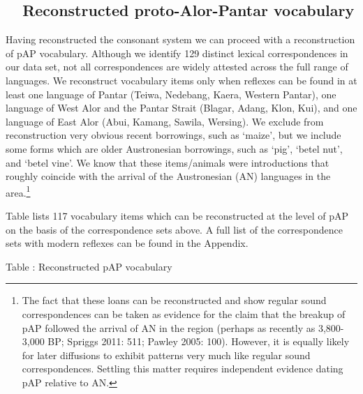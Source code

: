 \subsection[\ \ Reconstructed proto{}-Alor{}-Pantar vocabulary]{\ \ Reconstructed proto-Alor-Pantar vocabulary}
\hypertarget{RefHeading49927871885726}{}Having reconstructed the consonant system we can proceed with a reconstruction of pAP vocabulary. Although we identify 129 distinct lexical correspondences in our data set, not all correspondences are widely attested across the full range of languages. We reconstruct vocabulary items only when reflexes can be found in at least one language of Pantar (Teiwa, Nedebang, Kaera, Western Pantar), one language of West Alor and the Pantar Strait (Blagar, Adang, Klon, Kui), and one language of East Alor (Abui, Kamang, Sawila, Wersing). We exclude from reconstruction very obvious recent borrowings, such as {\textquoteleft}maize{\textquoteright}, but we include some forms which are older Austronesian borrowings, such as {\textquoteleft}pig{\textquoteright}, {\textquoteleft}betel nut{\textquoteright}, and {\textquoteleft}betel vine{\textquoteright}. We know that these items/animals were introductions that roughly coincide with the arrival of the Austronesian (AN) languages in the 
area.\footnote{ The fact that these loans can be reconstructed and show regular sound correspondences can be taken as evidence for the claim that the breakup of pAP followed the arrival of AN in the region (perhaps as recently as 3,800-3,000 BP; Spriggs 2011: 511; Pawley 2005: 100). However, it is equally likely for later diffusions to exhibit patterns very much like regular sound correspondences. Settling this matter requires independent evidence dating pAP relative to AN.} 

Table  lists 117 vocabulary items which can be reconstructed at the level of pAP on the basis of the correspondence sets above. A full list of the correspondence sets with modern reflexes can be found in the Appendix.

{\centering
\label{bkm:Ref340670270}Table : Reconstructed pAP vocabulary
\par}

